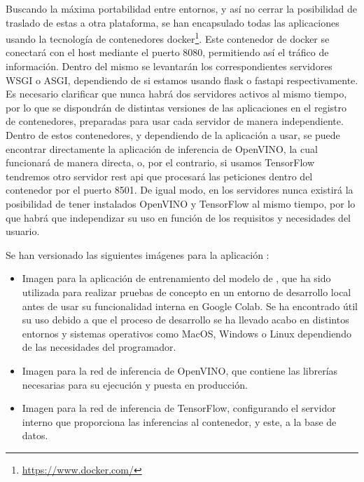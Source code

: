 Buscando la máxima portabilidad entre entornos, y así no cerrar la posibilidad de traslado de estas a otra plataforma, se han encapsulado todas las aplicaciones usando la tecnología de contenedores docker\footnote{\url{https://www.docker.com/}}.
Este contenedor de docker se conectará con el host mediante el puerto 8080, permitiendo así el tráfico de información.
Dentro del mismo se levantarán los correspondientes servidores WSGI o ASGI, dependiendo de si estamos usando flask o fastapi respectivamente.
Es necesario clarificar que nunca habrá dos servidores activos al mismo tiempo, por lo que se dispondrán de distintas versiones de las aplicaciones en el registro de contenedores, preparadas para usar cada servidor de manera independiente.
Dentro de estos contenedores, y dependiendo de la aplicación a usar, se puede encontrar directamente la aplicación de inferencia de OpenVINO, la cual funcionará de manera directa, o, por el contrario, si usamos TensorFlow tendremos otro servidor rest api que procesará las peticiones dentro del contenedor por el puerto 8501.
De igual modo, en los servidores nunca existirá la posibilidad de tener instalados OpenVINO y TensorFlow al mismo tiempo, por lo que habrá que independizar su uso en función de los requisitos y necesidades del usuario.

Se han versionado las siguientes imágenes para la aplicación :
\begin{itemize}
    \item Imagen para la aplicación de entrenamiento del modelo de , que ha sido utilizada para realizar pruebas de concepto en un entorno de desarrollo local antes de usar su funcionalidad
    interna en Google Colab.
    Se ha encontrado útil su uso debido a que el proceso de desarrollo se ha llevado acabo en distintos entornos y sistemas operativos como MacOS, Windows o Linux dependiendo de las necesidades del programador.
    \item Imagen para la red de inferencia de OpenVINO, que contiene las librerías necesarias para su ejecución y puesta en producción.
    \item Imagen para la red de inferencia de TensorFlow, configurando el servidor interno que proporciona las inferencias al contenedor, y este, a la base de datos.
\end{itemize}

